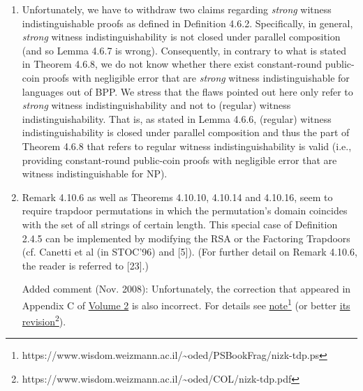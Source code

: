\documentclass[10pt,a4paper]{article}
\begin{document}
\begin{enumerate}
	\item Unfortunately, we have to withdraw two claims regarding \textit{strong} witness indistinguishable proofs as defined in Definition 4.6.2. Specifically, in general, \textit{strong} witness indistinguishability is not closed under parallel composition (and so Lemma 4.6.7 is wrong). Consequently, in contrary to what is stated in Theorem 4.6.8, we do not know whether there exist constant-round public-coin proofs with negligible error that are \textit{strong} witness indistinguishable for languages out of BPP. We stress that the flaws pointed out here only refer to \textit{strong} witness indistinguishability and not to (regular) witness indistinguishability. That is, as stated in Lemma 4.6.6, (regular) witness indistinguishability is closed under parallel composition and thus the part of Theorem 4.6.8 that refers to regular witness indistinguishability is valid (i.e., providing constant-round public-coin proofs with negligible error that are witness indistinguishable for NP).
	\item Remark 4.10.6 as well as Theorems 4.10.10, 4.10.14 and 4.10.16, seem to require trapdoor permutations in which the permutation's domain coincides with the set of all strings of certain length. This special case of Definition 2.4.5 can be implemented by modifying the RSA or the Factoring Trapdoors (cf. Canetti et al (in STOC'96) and [5]). (For further detail on Remark 4.10.6, the reader is referred to [23].) 
	
	Added comment (Nov. 2008): Unfortunately, the correction that appeared in Appendix C of \href{https://www.wisdom.weizmann.ac.il/~oded/foc-vol2.html}{Volume 2} is also incorrect. For details see \href{https://www.wisdom.weizmann.ac.il/~oded/PSBookFrag/nizk-tdp.ps}{note}\footnote{\label{nizkPS}https://www.wisdom.weizmann.ac.il/\textasciitilde oded/PSBookFrag/nizk-tdp.ps} (or better \href{https://www.wisdom.weizmann.ac.il/~oded/COL/nizk-tdp.pdf}{its revision}\footnote{\label{nizkPDF}https://www.wisdom.weizmann.ac.il/\textasciitilde oded/COL/nizk-tdp.pdf}). 
	

\end{enumerate}
\end{document}
